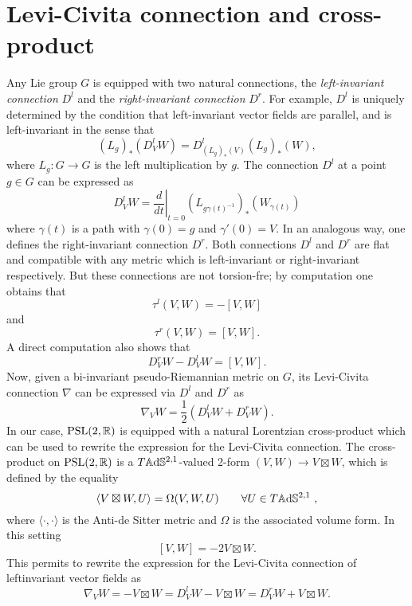 \section{Levi-Civita connection and cross-product}
Any Lie group $G$ is equipped with two natural connections, the \textit{left-invariant connection} $D^l$ and the \textit{right-invariant connection} $D^r$. For example, $D^l$ is uniquely determined by the condition that left-invariant vector fields are parallel, and is left-invariant in the sense that
\[
    (L_g)_*(D^l_V W) = D^l_{(L_g)_*(V)} (L_g)_*(W),
\]
where $L_g :G \to G$ is the left multiplication by $g$. The connection $D^l$ at a point $g\in G$ can be expressed as
\[
    D^l_V W = \left. \frac{d}{dt} \right|_{t=0} (L_{g \gamma(t)^{-1}})_* (W_{\gamma(t)})
\]
where $\gamma(t)$ is a path with $\gamma(0) = g$ and $\gamma'(0) = V$.
In an analogous way, one defines the right-invariant connection $D^r$. Both connections $D^l$ and $D^r$ are flat and compatible with any metric which is left-invariant or right-invariant respectively. But these connections are not torsion-fre; by computation one obtains that
\[
    \tau^l (V,W) = - \left[ V,W \right]
\]
and
\[
    \tau^r (V,W) = \left[ V,W \right].
\]
A direct computation also shows that
\[
    D^r_V W - D^l_V W = \left[ V,W \right].
\]
Now, given a bi-invariant pseudo-Riemannian metric on $G$, its Levi-Civita connection $\nabla$ can be expressed via $D^l$ and $D^r$ as 
\[
    \nabla_V W = \frac{1}{2} (D^l_V W + D^r_V W).
\]
In our case, $\text{PSL}(2,\mathbb{R})$ is equipped with a natural Lorentzian cross-product which can be used to rewrite the expression for the Levi-Civita connection. The cross-product on $\text{PSL}(2,\mathbb{R})$ is a $T \mathbb{A}\mathrm{d}\mathbb{S}^{2,1}$-valued 2-form $(V,W) \to V \boxtimes W$, which is defined by the equality
\[
    \langle V \boxtimes W , U \rangle = \Omega(V,W,U) \qquad \forall U \in T\A^{2,1} \ ,
\]
where $\langle \cdot, \cdot \rangle$ is the Anti-de Sitter metric and $\Omega$ is the associated volume form. In this setting
\[
    \left[ V,W \right] = -2 V \boxtimes W.
\]
This permits to rewrite the expression for the Levi-Civita connection of leftinvariant vector fields as
\[
    \nabla_V W = - V \boxtimes W = D^l_V W - V \boxtimes W = D^r_V W + V \boxtimes W.
\]
